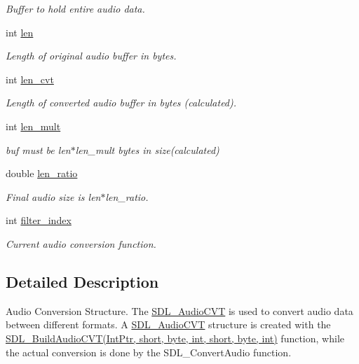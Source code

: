 \begin{DoxyCompactItemize}
\begin{DoxyCompactList}\small\item\em Buffer to hold entire audio data. \item\end{DoxyCompactList}\item 
int \hyperlink{struct_tao_1_1_sdl_1_1_sdl_1_1_s_d_l___audio_c_v_t_a266a472d3486caac7c30d76decf93060}{len}
\begin{DoxyCompactList}\small\item\em Length of original audio buffer in bytes. \item\end{DoxyCompactList}\item 
int \hyperlink{struct_tao_1_1_sdl_1_1_sdl_1_1_s_d_l___audio_c_v_t_afa598d7f6ea5a01b48eb3a9abf6a1330}{len\_\-cvt}
\begin{DoxyCompactList}\small\item\em Length of converted audio buffer in bytes (calculated). \item\end{DoxyCompactList}\item 
int \hyperlink{struct_tao_1_1_sdl_1_1_sdl_1_1_s_d_l___audio_c_v_t_ab4b192a9b37bc2b12a3c3e2ae75cff6b}{len\_\-mult}
\begin{DoxyCompactList}\small\item\em buf must be len$\ast$len\_\-mult bytes in size(calculated) \item\end{DoxyCompactList}\item 
double \hyperlink{struct_tao_1_1_sdl_1_1_sdl_1_1_s_d_l___audio_c_v_t_a44c58ef048924e18f4f7ad0fa43ee678}{len\_\-ratio}
\begin{DoxyCompactList}\small\item\em Final audio size is len$\ast$len\_\-ratio. \item\end{DoxyCompactList}\item 
int \hyperlink{struct_tao_1_1_sdl_1_1_sdl_1_1_s_d_l___audio_c_v_t_a5ac13735d9e6e12c22626a1d40fcb1b8}{filter\_\-index}
\begin{DoxyCompactList}\small\item\em Current audio conversion function. \item\end{DoxyCompactList}\end{DoxyCompactItemize}


\subsection{Detailed Description}
Audio Conversion Structure. The \hyperlink{struct_tao_1_1_sdl_1_1_sdl_1_1_s_d_l___audio_c_v_t}{SDL\_\-AudioCVT} is used to convert audio data between different formats. A \hyperlink{struct_tao_1_1_sdl_1_1_sdl_1_1_s_d_l___audio_c_v_t}{SDL\_\-AudioCVT} structure is created with the \hyperlink{_sdl_8cs_ab290a18bf5bf8a161042ceb8c43c5654}{SDL\_\-BuildAudioCVT(IntPtr, short, byte, int, short, byte, int)} function, while the actual conversion is done by the SDL\_\-ConvertAudio function. 

